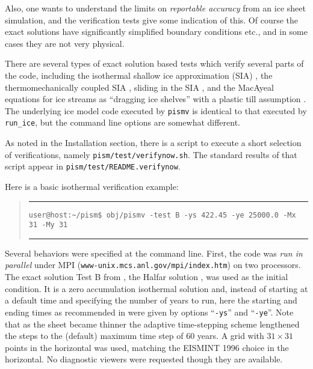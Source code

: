 \documentclass[11pt,final]{amsart}
\renewcommand{\t}[1]{\texttt{#1}}
\newcommand{\Vend}{ \rule{4.6in}{0.1mm}\end{quote}\normalsize }
\newcommand{\beginV}{ \scriptsize\begin{quote}\rule{4.6in}{0.1mm}\begin{verbatim} }
\begin{document}
Also, one wants to understand the limits on \emph{reportable accuracy} from an ice sheet simulation, and the verification tests give some indication of this.  Of course the exact solutions have significantly simplified boundary conditions etc., and in some cases they are not very physical.

There are several types of exact solution based tests which verify several parts of the code, including the isothermal shallow ice approximation (SIA) \cite{BLKCB}, the thermomechanically coupled SIA \cite{BBL,BB}, sliding in the SIA \cite{BLKCB}, and the MacAyeal equations for ice streams as ``dragging ice shelves'' \cite{MacAyeal} with a plastic till assumption \cite{SchoofStream}.  The underlying ice model code executed by \t{pismv} is identical to that executed by \verb|run_ice|, but the command line options are somewhat different.

As noted in the Installation section, there is a script to execute a short selection of verifications, namely \t{pism/test/verifynow.sh}.  The standard results of that script appear in \t{pism/test/README.verifynow}.

Here is a basic isothermal verification example:

\beginV
user@host:~/pism$ obj/pismv -test B -ys 422.45 -ye 25000.0 -Mx 31 -My 31
\end{verbatim}
\Vend

Several behaviors were specified at the command line.  First, the code was \emph{run in parallel} under MPI (\texttt{www-unix.mcs.anl.gov/mpi/index.htm}) on two processors.  The exact solution Test B from \cite{BLKCB}, the Halfar solution \cite{Halfar83}, was used as the initial condition.  It is a zero accumulation isothermal solution and, instead of starting at a default time and specifying the number of years to run, here the starting and ending times as recommended in \cite{BLKCB} were given by options ``\t{-ys}'' and ``\t{-ye}''.  Note that as the sheet became thinner the adaptive time-stepping scheme lengthened the steps to the (default) maximum time step of 60 years.  A grid with $31\times 31$ points in the horizontal was used, matching the EISMINT 1996 choice \cite{EISMINT96} in the horizontal.  No diagnostic viewers were requested though they are available.
\end{document}
